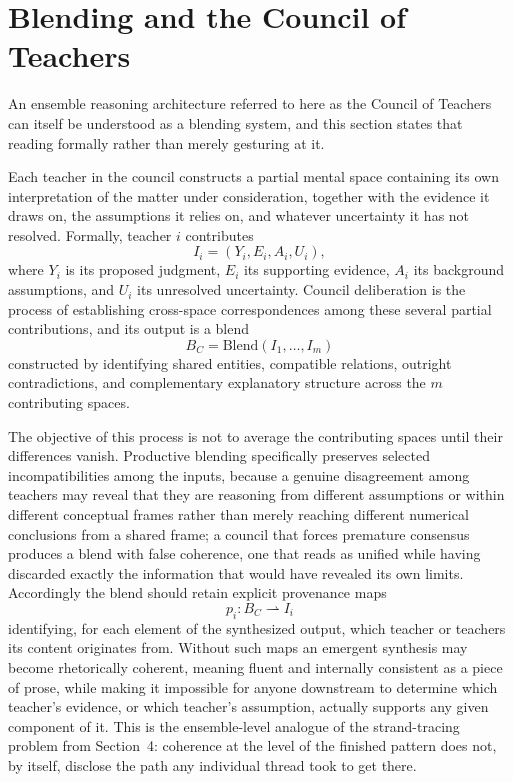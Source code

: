 \documentclass[11pt,openany]{book}
\begin{document}
\section{Blending and the Council of Teachers}

An ensemble reasoning architecture referred to here as the Council of Teachers can itself be understood as a blending system, and this section states that reading formally rather than merely gesturing at it.

Each teacher in the council constructs a partial mental space containing its own interpretation of the matter under consideration, together with the evidence it draws on, the assumptions it relies on, and whatever uncertainty it has not resolved. Formally, teacher $i$ contributes
\[
I_i = (Y_i, E_i, A_i, U_i),
\]
where $Y_i$ is its proposed judgment, $E_i$ its supporting evidence, $A_i$ its background assumptions, and $U_i$ its unresolved uncertainty. Council deliberation is the process of establishing cross-space correspondences among these several partial contributions, and its output is a blend
\[
B_C = \mathrm{Blend}(I_1, \ldots, I_m)
\]
constructed by identifying shared entities, compatible relations, outright contradictions, and complementary explanatory structure across the $m$ contributing spaces.

The objective of this process is not to average the contributing spaces until their differences vanish. Productive blending specifically preserves selected incompatibilities among the inputs, because a genuine disagreement among teachers may reveal that they are reasoning from different assumptions or within different conceptual frames rather than merely reaching different numerical conclusions from a shared frame; a council that forces premature consensus produces a blend with false coherence, one that reads as unified while having discarded exactly the information that would have revealed its own limits. Accordingly the blend should retain explicit provenance maps
\[
p_i : B_C \rightharpoonup I_i
\]
identifying, for each element of the synthesized output, which teacher or teachers its content originates from. Without such maps an emergent synthesis may become rhetorically coherent, meaning fluent and internally consistent as a piece of prose, while making it impossible for anyone downstream to determine which teacher's evidence, or which teacher's assumption, actually supports any given component of it. This is the ensemble-level analogue of the strand-tracing problem from Section~4: coherence at the level of the finished pattern does not, by itself, disclose the path any individual thread took to get there.
\end{document}
